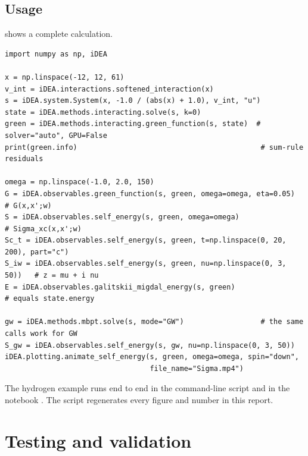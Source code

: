 \documentclass[11pt,a4paper]{article}
\newcommand{\GW}{\textit{GW}}
\begin{document}
\subsection{Usage}

 shows a complete calculation.

\begin{lstlisting}[style=python,float=tbp,caption={Computing, evaluating and animating the exact $G$ and $\Sigma$ of the hydrogen atom, and the same calls for \GW{}.},label=lst:usage,captionpos=b]
import numpy as np, iDEA

x = np.linspace(-12, 12, 61)
v_int = iDEA.interactions.softened_interaction(x)
s = iDEA.system.System(x, -1.0 / (abs(x) + 1.0), v_int, "u")
state = iDEA.methods.interacting.solve(s, k=0)
green = iDEA.methods.interacting.green_function(s, state)  # solver="auto", GPU=False
print(green.info)                                           # sum-rule residuals

omega = np.linspace(-1.0, 2.0, 150)
G = iDEA.observables.green_function(s, green, omega=omega, eta=0.05)      # G(x,x';w)
S = iDEA.observables.self_energy(s, green, omega=omega)                   # Sigma_xc(x,x';w)
Sc_t = iDEA.observables.self_energy(s, green, t=np.linspace(0, 20, 200), part="c")
S_iw = iDEA.observables.self_energy(s, green, nu=np.linspace(0, 3, 50))   # z = mu + i nu
E = iDEA.observables.galitskii_migdal_energy(s, green)                    # equals state.energy

gw = iDEA.methods.mbpt.solve(s, mode="GW")                  # the same calls work for GW
S_gw = iDEA.observables.self_energy(s, gw, nu=np.linspace(0, 3, 50))
iDEA.plotting.animate_self_energy(s, green, omega=omega, spin="down",
                                  file_name="Sigma.mp4")
\end{lstlisting}

The hydrogen example runs end to end in the command-line script  and in the notebook . The script  regenerates every figure and number in this report.

\section{Testing and validation}
\label{sec:testing}
\end{document}
